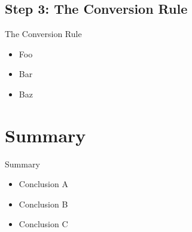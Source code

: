 \documentclass{beamer}
\begin{document}
\subsection{Step 3: The Conversion Rule}

\begin{frame}{The Conversion Rule}

  \begin{itemize}
    \item
      Foo
    \item
      Bar
    \item
      Baz
  \end{itemize}

\end{frame}












\section*{Summary}

\begin{frame}{Summary}

  \begin{itemize}
  \item
    Conclusion A
  \item
    Conclusion B
  \item
    Conclusion C
  \end{itemize}

\end{frame}
\end{document}
